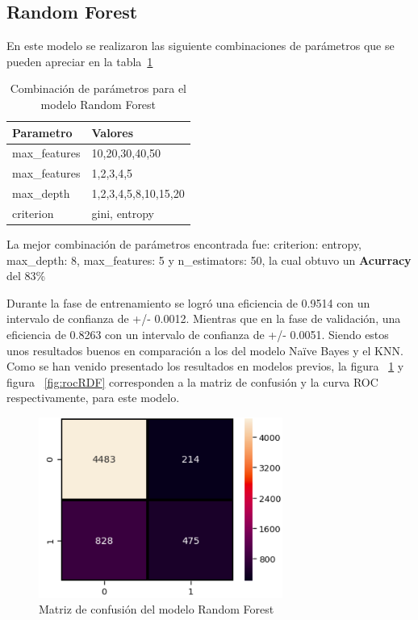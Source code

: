\documentclass[conference]{IEEEtran}
\begin{document}
\subsection{Random Forest}
En este modelo se realizaron las siguiente combinaciones de parámetros que se pueden apreciar en la tabla~\ref{tab:parametrosRDF}
\hfill
\\ 
\begin{table}[H]
\centering
\begin{tabular}{|l|l|}
\hline
Parametro    & Valores              \\ \hline
max\_features & 10,20,30,40,50       \\ \hline
max\_features & 1,2,3,4,5            \\ \hline
max\_depth    & 1,2,3,4,5,8,10,15,20 \\ \hline
criterion    & gini, entropy    \\ \hline
\end{tabular}
\caption{Combinación de parámetros para el modelo Random Forest}
\label{tab:parametrosRDF}
\end{table}
La mejor combinación de parámetros encontrada fue: criterion: entropy, max\_depth: 8, max\_features: 5 y n\_estimators: 50, la cual obtuvo un \textbf{Acurracy} del 83\%

Durante la fase de entrenamiento se logró una eficiencia de 0.9514 con un intervalo de confianza de +/- 0.0012. Mientras que en la fase de validación, una eficiencia de 0.8263  con un intervalo de confianza de +/- 0.0051. Siendo estos unos resultados buenos en comparación a los del modelo Naïve Bayes y el KNN.
Como se han venido presentado los resultados en modelos previos, la figura ~\ref{fig:matrixRDF}  y figura ~\ref{fig:rocRDF} corresponden a la matriz de confusión y la curva ROC respectivamente, para este modelo.

\begin{center}
    \begin{figure}[H]
        \hfill
     \centerline{\includegraphics[width=8cm]{matrixRDF.png}}
    \caption{Matriz de confusión del modelo Random Forest }
    \label{fig:matrixRDF}
    \end{figure}  
\end{center}
\end{document}
